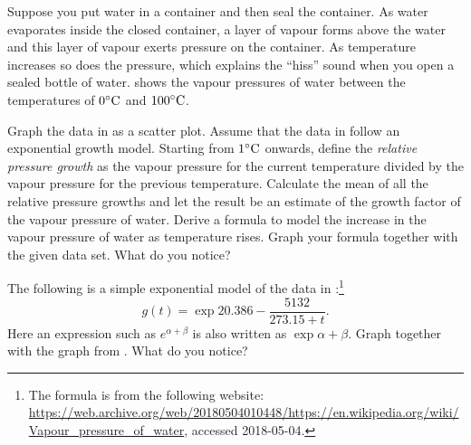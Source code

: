 \documentclass[a4paper,oneside,12pt]{article}
\begin{document}
\begin{problem}
\item Suppose you put water in a container and then seal the
  container.  As water evaporates inside the closed container, a layer
  of vapour forms above the water and this layer of vapour exerts
  pressure on the container.  As temperature increases so does the
  pressure, which explains the ``hiss'' sound when you open a sealed
  bottle of water.   shows the vapour
  pressures of water between the temperatures of ${0}^{\circ}\textrm{C}$ and
  ${100}^{\circ}\textrm{C}$.
  \begin{packedenum}
  \item\label{subprob:water_mean_growth_factor}
    Graph the data in  as a scatter
    plot.  Assume that the data in 
    follow an exponential growth model.  Starting from ${1}^{\circ}\textrm{C}$
    onwards, define the \emph{relative pressure growth} as the vapour
    pressure for the current temperature divided by the vapour
    pressure for the previous temperature.  Calculate the mean of all
    the relative pressure growths and let the result be an estimate of
    the growth factor of the vapour pressure of water.  Derive a
    formula to model the increase in the vapour pressure of water as
    temperature rises.  Graph your formula together with the given
    data set.  What do you notice?

  \item\label{subprob:water_Wikipedia_formula}
    The following is a simple exponential model of the data in
    :\footnote{
      The formula is from the following website:
      \url{https://web.archive.org/web/20180504010448/https://en.wikipedia.org/wiki/Vapour_pressure_of_water},
      accessed 2018-05-04.
    }
    \begin{equation}
    \label{eqn:vapour_pressure_Wikipedia_formula}
    g(t)
    =
    \exp{
      20.386
      -
      \frac{5132}{273.15 + t}
    }.
    \end{equation}
    Here an expression such as $e^{\alpha + \beta}$ is also written as
    $\exp{\alpha + \beta}$.  Graph
     together with the
    graph from .  What do you
    notice?


\end{packedenum}
\end{problem}
\end{document}
